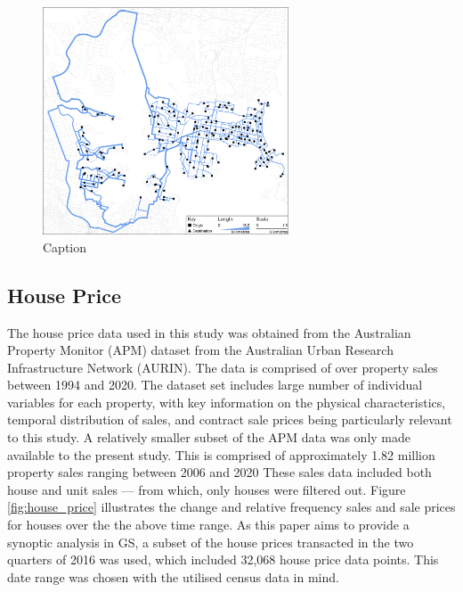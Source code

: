 \begin{figure}[H]
    \centering
    \includegraphics[width=0.65\textwidth]{body/figures/OD1.png}
    \caption{Caption}
    \label{fig:flows}
\end{figure}

\subsection{House Price}

The house price data used in this study was obtained from the Australian Property Monitor (APM) dataset from the Australian Urban Research Infrastructure Network (AURIN). The data is comprised of over property sales between 1994 and 2020. The dataset set includes large number of individual variables for each property, with key information on the physical characteristics, temporal distribution of sales, and contract sale prices being particularly relevant to this study. A relatively smaller subset of the APM data was only made available to the present study. This is comprised of approximately 1.82 million property sales ranging between 2006 and 2020 These sales data included both house and unit sales --- from which, only houses were filtered out. Figure \ref{fig:house_price} illustrates the change and relative frequency sales and sale prices for houses over the the above time range. As this paper aims to provide a synoptic analysis in GS, a subset of the house prices transacted in the two quarters of 2016 was used, which included 32,068 house price data points. This date range was chosen with the utilised census data in mind.\\

